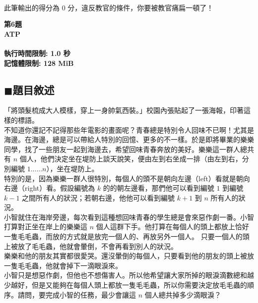 \documentclass[12pt,a4paper]{article}
\begin{document}
　\\

此筆輸出的得分為 $0$ 分，違反教官的條件，你要被教官痛扁一頓了！

\newpage

\begin{center}
\textbf{{\Huge 第6題\\ATP\\}~\\執行時間限制: 1.0 秒\\記憶體限制: 128 MiB}
\end{center}


\subsection*{$\blacksquare$題目敘述}

「將頭髮梳成大人模樣，穿上一身帥氣西裝。」校園內張貼起了一張海報，印著這樣的標語。\\

不知道你還記不記得那些年電影的畫面呢？青春總是特別令人回味不已啊！尤其是海邊。在海邊，總是可以帶給人特別的回憶、更多的不一樣。於是即將畢業的樂樂同學，找了一些朋友一起到海邊去，希望回味青春奔放的美好。樂樂這一群人總共有 $n$ 個人，他們決定坐在堤防上談天說笑，便由左到右坐成一排（由左到右，分別編號 $1 ...... n $），坐在堤防上。\\

特別的是，因為樂樂一群人很特別，每個人的頭不是朝向左邊（left）看就是朝向右邊（right）看。假設編號為 $k$ 的的朝左邊看，那們他可以看到編號 $1$ 到編號 $k-1$ 之間所有人的狀況；若朝右邊，他他可以看到編號 $k+1$ 到 $n$ 所有人的狀況。\\

小智就住在海岸旁邊，每次看到這種想回味青春的學生總是會來惡作劇一番。小智打算對正坐在岸上的樂樂這 $n$ 個人這群下手。他打算在每個人的頭上都放上恰好一隻毛毛蟲，而放的方式就是放完一個人的、再放另外一個人。 只要一個人的頭上被放了毛毛蟲，他就會暈倒，不會再看到別人的狀況。\\

樂樂和他的朋友其實都很愛哭。還沒暈倒的每個人，只要看到他的朋友的頭上被放一隻毛毛蟲，他就會掉下一滴眼淚來。\\

小智只是想惡作劇，但他也不想傷害人。所以他希望讓大家所掉的眼淚滴數總和越少越好，但是又能夠在每個人頭上都放一隻毛毛蟲，所以你需要決定放毛毛蟲的順序。請問，要完成小智的任務，最少會讓這 $n$ 個人總共掉多少滴眼淚？\\
\end{document}
